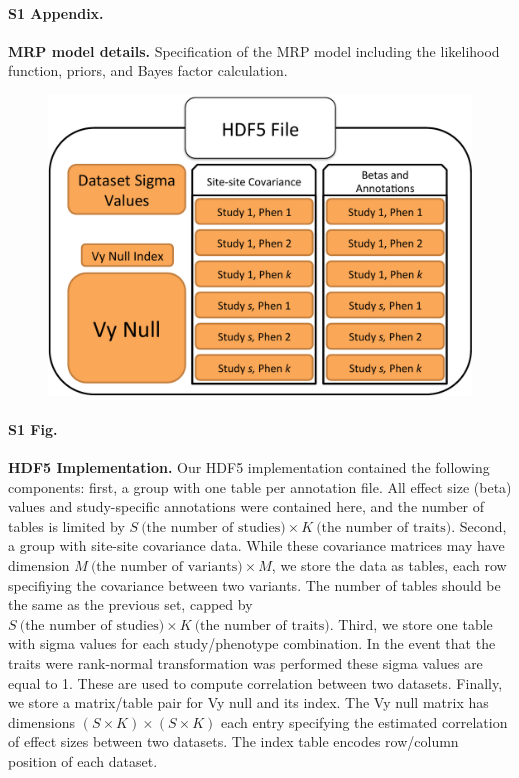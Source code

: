 
\paragraph*{S1 Appendix.}
\label{S1_Appendix}
{\bf MRP model details.} Specification of the MRP model including the likelihood function, priors, and Bayes factor calculation.

\begin{figure}[H]
\includegraphics[width=\textwidth]{../figures/final/Figure_S01.pdf}
\end{figure}
\paragraph*{S1 Fig.}
\label{hdf5_fig}
{\bf HDF5 Implementation.} Our HDF5 implementation contained the following components: first, a group with one table per annotation file. All effect size (beta) values and study-specific annotations were contained here, and the number of tables is limited by $S\ \textrm{(the number of studies)} \times K\ \textrm{(the number of traits)}$. Second, a group with site-site covariance data. While these covariance matrices may have dimension $M\ \textrm{(the number of variants)} \times M$, we store the data as tables, each row specifiying the covariance between two variants. The number of tables should be the same as the previous set, capped by $S\ \textrm{(the number of studies)} \times K\ \textrm{(the number of traits)}$. Third, we store one table with sigma values for each study/phenotype combination. In the event that the traits were rank-normal transformation was performed these sigma values are equal to 1. These are used to compute correlation between two datasets. Finally, we store a matrix/table pair for Vy null and its index. The Vy null matrix has dimensions $ (S \times K) \times (S \times K)$ each entry specifying the estimated correlation of effect sizes between two datasets. The index table encodes row/column position of each dataset.

